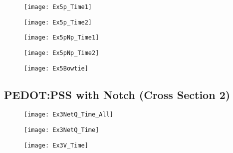 \begin{landscape}
\begin{figure}[!htp]
\centering
\texttt{[image: Ex5p\_Time1]}
\caption{} 
\label{}
\end{figure}
\end{landscape}

\begin{landscape}
\begin{figure}[!htp]
\centering
\texttt{[image: Ex5p\_Time2]}
\caption{} 
\label{}
\end{figure}
\end{landscape}


\begin{landscape}
\begin{figure}[!htp]
\centering
\texttt{[image: Ex5pNp\_Time1]}
\caption{} 
\label{}
\end{figure}
\end{landscape}

\begin{landscape}
\begin{figure}[!htp]
\centering
\texttt{[image: Ex5pNp\_Time2]}
\caption{} 
\label{}
\end{figure}
\end{landscape}


\begin{figure}[!htp]
\centering
\texttt{[image: Ex5Bowtie]}
\caption{} 
\label{}
\end{figure}

\clearpage
\subsection{PEDOT:PSS with Notch (Cross Section 2)}
\begin{figure}[!htp]
\centering
\texttt{[image: Ex3NetQ\_Time\_All]}
\caption{} 
\label{}
\end{figure}


\begin{landscape}
\begin{figure}[!htp]
\centering
\texttt{[image: Ex3NetQ\_Time]}
\caption{} 
\label{}
\end{figure}
\end{landscape}

\begin{landscape}
\begin{figure}[!htp]
\centering
\texttt{[image: Ex3V\_Time]}
\caption{} 
\label{}
\end{figure}
\end{landscape}

